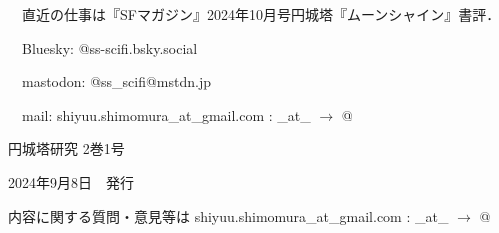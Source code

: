 \documentclass[10pt, a5paper, twoside]{jsarticle}
\theoremstyle{definition}
\begin{document}
	　直近の仕事は『SFマガジン』2024年10月号円城塔『ムーンシャイン』書評．

	　Bluesky: @ss-scifi.bsky.social

	　mastodon: @ss\_scifi@mstdn.jp

	　mail: shiyuu.shimomura\_at\_gmail.com : \_at\_ $\rightarrow$ @

	\vfill

	\hrulefill

	\center

	{\Large 円城塔研究 2巻1号}

	2024年9月8日　発行


	\hrulefill

	内容に関する質問・意見等は shiyuu.shimomura\_at\_gmail.com : \_at\_ $\rightarrow$ @
\end{document}
